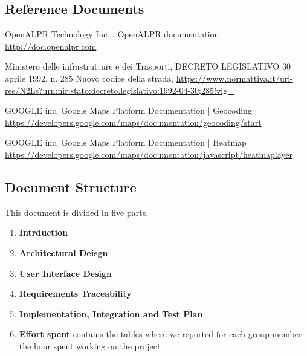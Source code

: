 \subsection{Reference Documents}
\begin{thebibliography}{00}
OpenALPR Technology Inc. ,
OpenALPR documentation \url{http://doc.openalpr.com}

 Ministero delle infrastrutture e dei Trasporti,
DECRETO LEGISLATIVO 30 aprile 1992, n. 285 Nuovo codice della strada,
 \url{https://www.normattiva.it/uri-res/N2Ls?urn:nir:stato:decreto.legislativo:1992-04-30;285!vig=}

 GOOGLE inc,
 Google Maps Platform Documentation | Geocoding
 \url{https://developers.google.com/maps/documentation/geocoding/start}

 GOOGLE inc,
 Google Maps Platform Documentation | Heatmap
 \url{https://developers.google.com/maps/documentation/javascript/heatmaplayer}

\end{thebibliography}

\subsection{Document Structure}
This document is divided in five parts.

\begin{enumerate}
  \item \textbf{Intrduction}

  \item \textbf{Architectural Deisgn}

  \item \textbf{User Interface Design}

  \item \textbf{Requirements Traceability}

  \item \textbf{Implementation, Integration and Test Plan}
  
  \item \textbf{Effort spent} contains the tables where we reported for each group member the hour spent working on the project
\end{enumerate}
